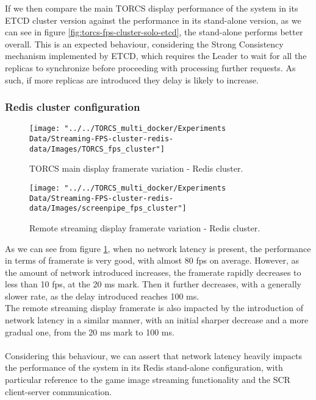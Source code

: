 If we then compare the main TORCS display performance of the system in its ETCD cluster version against the performance in its stand-alone version, as we can see in figure \ref{fig:torcs-fps-cluster-solo-etcd}, the stand-alone performs better overall. This is an expected behaviour, considering the Strong Consistency mechanism implemented by ETCD, which requires the Leader to wait for all the replicas to synchronize before proceeding with processing further requests. As such, if more replicas are introduced they delay is likely to increase.

\subsubsection{Redis cluster configuration}
\begin{figure}[h!]
	\centering
	\texttt{[image: "../../TORCS\_multi\_docker/Experiments Data/Streaming-FPS-cluster-redis-data/Images/TORCS\_fps\_cluster"]}
	\caption[TORCS main display framerate variation - Redis cluster]{TORCS main display framerate variation - Redis cluster.}
	\label{fig:torcs-merged-fps-redis-cluster}
\end{figure}
\begin{figure}[h!]
	\centering
	\texttt{[image: "../../TORCS\_multi\_docker/Experiments Data/Streaming-FPS-cluster-redis-data/Images/screenpipe\_fps\_cluster"]}
	\caption[Remote streaming display framerate variation - Redis cluster]{Remote streaming display framerate variation - Redis cluster.}
	\label{fig:screenpipe-merged-fps-redis-cluster}
\end{figure}
As we can see from figure \ref{fig:torcs-merged-fps-redis-cluster}, when no network latency is present, the performance in terms of framerate is very good, with almost 80 fps on average. However, as the amount of network introduced increases, the framerate rapidly decreases to less than 10 fps, at the 20 ms mark. Then it further decreases, with a generally slower rate, as the delay introduced reaches 100 ms. \\
The remote streaming display framerate is also impacted by the introduction of network latency in a similar manner, with an initial sharper decrease and a more gradual one, from the 20 ms mark to 100 ms. \\ \\
Considering this behaviour, we can assert that network latency heavily impacts the performance of the system in its Redis stand-alone configuration, with particular reference to the game image streaming functionality and the SCR client-server communication. \\ \\
